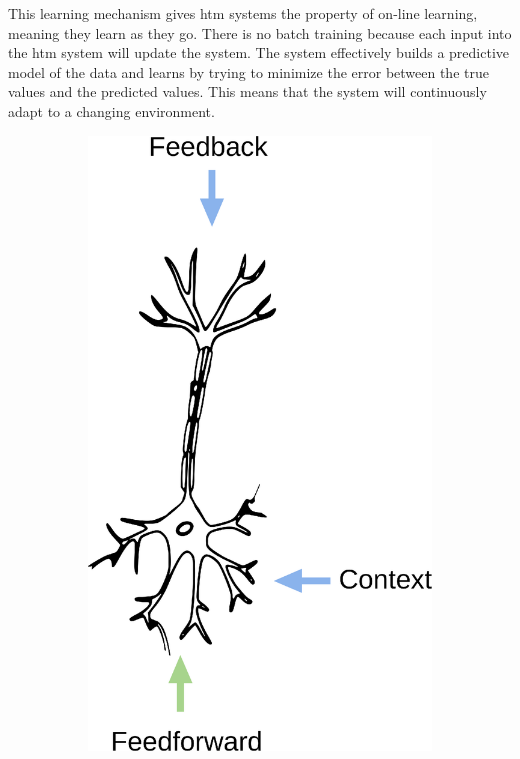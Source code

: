 This learning mechanism gives \gls*{htm} systems the property of on-line learning, meaning they learn as they go. There is no batch training because each input into the \gls*{htm} system will update the system. The system effectively builds a predictive model of the data and learns by trying to minimize the error between the true values and the predicted values. This means that the system will continuously adapt to a changing environment.
\begin{figure}[htb]
    \centering
    \begin{subfigure}[b]{0.35\linewidth}
        \centering
        \hspace*{1cm}
        \includegraphics[width=\linewidth]{resources/related_works/neuron_biological}

\end{subfigure}
\end{figure}
